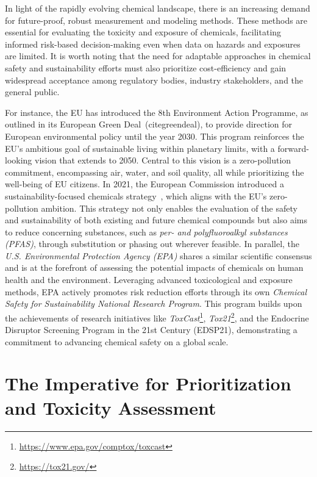 In light of the rapidly evolving chemical landscape, there is an increasing demand for future-proof, robust measurement and modeling methods. These methods are essential for evaluating the toxicity and exposure of chemicals, facilitating  informed risk-based decision-making even when data on hazards and exposures are limited. It is worth noting that the need for adaptable approaches in chemical safety and sustainability efforts must also prioritize cost-efficiency and gain widespread acceptance among regulatory bodies, industry stakeholders, and the general public.

For instance, the EU has introduced the 8th Environment Action Programme, as outlined in its European Green Deal~(cite{greendeal}), to provide direction for European environmental policy until the year 2030. This program reinforces the EU's ambitious goal of sustainable living within planetary limits, with a forward-looking vision that extends to 2050. Central to this vision is a zero-pollution commitment, encompassing air, water, and soil quality, all while prioritizing the well-being of EU citizens. In 2021, the European Commission introduced a sustainability-focused chemicals strategy~\cite{EUChemicalsStrategy}, which aligns with the EU's zero-pollution ambition. This strategy not only enables the evaluation of the safety and sustainability of both existing and future chemical compounds but also aims to reduce concerning substances, such as \emph{per- and polyfluoroalkyl substances (PFAS)}, through substitution or phasing out wherever feasible. In parallel, the \emph{U.S. Environmental Protection Agency (EPA)} shares a similar scientific consensus and is at the forefront of assessing the potential impacts of chemicals on human health and the environment. Leveraging advanced toxicological and exposure methods, EPA actively promotes risk reduction efforts through its own \emph{Chemical Safety for Sustainability National Research Program}. This program builds upon the achievements of research initiatives like \emph{ToxCast}\footnote{\url{https://www.epa.gov/comptox/toxcast}}, \emph{Tox21}\footnote{\url{https://tox21.gov/}}, and the Endocrine Disruptor Screening Program in the 21st Century (EDSP21), demonstrating a commitment to advancing chemical safety on a global scale.


\section{The Imperative for Prioritization and Toxicity Assessment}

